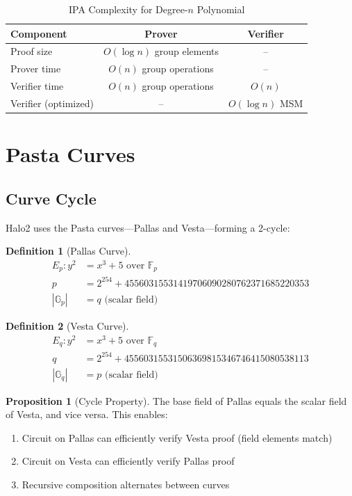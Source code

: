 \documentclass[11pt,a4paper]{article}
\theoremstyle{definition}
\newtheorem{definition}{Definition}
\newtheorem{proposition}{Proposition}
\begin{document}
\begin{table}[h]
\centering
\caption{IPA Complexity for Degree-$n$ Polynomial}
\begin{tabular}{lcc}
\toprule
Component & Prover & Verifier \\
\midrule
Proof size & $O(\log n)$ group elements & -- \\
Prover time & $O(n)$ group operations & -- \\
Verifier time & $O(n)$ group operations & $O(n)$ \\
Verifier (optimized) & -- & $O(\log n)$ MSM \\
\bottomrule
\end{tabular}
\end{table}

\section{Pasta Curves}

\subsection{Curve Cycle}

Halo2 uses the Pasta curves---Pallas and Vesta---forming a 2-cycle:

\begin{definition}[Pallas Curve]
    \begin{align}
        E_p: y^2 &= x^3 + 5 \text{ over } \mathbb{F}_p \\
        p &= 2^{254} + 45560315531419706090280762371685220353 \\
        |\mathbb{G}_p| &= q \text{ (scalar field)}
    \end{align}
\end{definition}

\begin{definition}[Vesta Curve]
    \begin{align}
        E_q: y^2 &= x^3 + 5 \text{ over } \mathbb{F}_q \\
        q &= 2^{254} + 45560315531506369815346746415080538113 \\
        |\mathbb{G}_q| &= p \text{ (scalar field)}
    \end{align}
\end{definition}

\begin{proposition}[Cycle Property]
    The base field of Pallas equals the scalar field of Vesta, and vice versa. This enables:
    \begin{enumerate}
        \item Circuit on Pallas can efficiently verify Vesta proof (field elements match)
        \item Circuit on Vesta can efficiently verify Pallas proof
        \item Recursive composition alternates between curves
    \end{enumerate}
\end{proposition}
\end{document}
